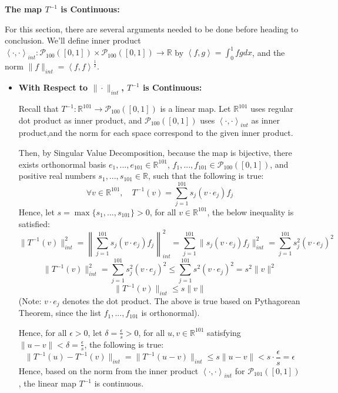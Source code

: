 \documentclass{article}
\begin{document}
\begin{itemize}
    \hfill

    \textbf{The map $T^{-1}$ is Continuous:}

    For this section, there are several arguments needed to be done before heading to conclusion. We'll define inner product $\left<\cdot,\cdot\right>_{int}:\mathcal{P}_{100}([0,1])\times \mathcal{P}_{100}([0,1])\rightarrow\mathbb{R}$ by $\left<f,g\right>=\int_{0}^{1}fg dx$, 
    and the norm $\|f\|_{int}=\left<f,f\right>^\frac{1}{2}$.

    \begin{itemize}
        \item \textbf{With Respect to $\|\cdot\|_{int}$, $T^{-1}$ is Continuous:}
        
        Recall that $T^{-1}:\mathbb{R}^{101}\rightarrow\mathcal{P}_{100}([0,1])$ is a linear map. Let $\mathbb{R}^{101}$ uses regular dot product as inner product, and $\mathcal{P}_{100}([0,1])$ uses $\left<\cdot,\cdot\right>_{int}$ as inner product,and the norm for each space correspond to the given inner product.

        Then, by Singular Value Decomposition, because the map is bijective, there exists orthonormal basis $e_1,...,e_{101}\in\mathbb{R}^{101}$, $f_1,...,f_{101}\in\mathcal{P}_{100}([0,1])$, and positive real numbers $s_1,...,s_{101}\in\mathbb{R}$,
        such that the following is true:
        $$\forall v\in\mathbb{R}^{101},\quad T^{-1}(v)=\sum_{j=1}^{101}s_j(v\cdot e_j)f_j$$
        Hence, let $s=\max\{s_1,...,s_{101}\}>0$, for all $v\in\mathbb{R}^{101}$, the below inequality is satisfied:
        $$\|T^{-1}(v)\|_{int}^2=\left\|\sum_{j=1}^{101}s_j(v\cdot e_j)f_j\right\|_{int}^2 = \sum_{j=1}^{101}\|s_j(v\cdot e_j)f_j\|_{int}^2 = \sum_{j=1}^{101}s_j^2 (v\cdot e_j)^2$$
        $$\|T^{-1}(v)\|_{int}^2 = \sum_{j=1}^{101}s_j^2 (v\cdot e_j)^2 \leq \sum_{j=1}^{101}s^2 (v\cdot e_j)^2 = s^2\|v\|^2$$
        $$\|T^{-1}(v)\|_{int}\leq s\|v\|$$
        (Note: $v\cdot e_j$ denotes the dot product. The above is true based on Pythagorean Theorem, since the list $f_1,...,f_{101}$ is orthonormal).

        Hence, for all $\epsilon>0$, let $\delta = \frac{\epsilon}{s}>0$, for all $u,v\in\mathbb{R}^{101}$ satisfying $\|u-v\|<\delta = \frac{\epsilon}{s}$, the following is true:
        $$\|T^{-1}(u)-T^{-1}(v)\|_{int} = \|T^{-1}(u-v)\|_{int}\leq s\|u-v\| < s\cdot \frac{\epsilon}{s}=\epsilon$$
        Hence, based on the norm from the inner product $\left<\cdot,\cdot\right>_{int}$ for $\mathcal{P}_{101}([0,1])$, the linear map $T^{-1}$ is continuous.


\end{itemize}
\end{itemize}
\end{document}
